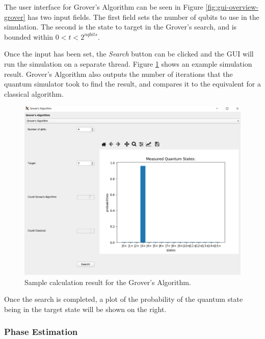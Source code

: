 \documentclass{article}
\begin{document}
The user interface for Grover's Algorithm can be seen in Figure \ref{fig:gui-overview-grover} has two input fields.
The first field sets the number of qubits to use in the simulation.
The second is the state to target in the Grover's search, and is bounded within $0 < t < 2^{nqbits}$.

Once the input has been set, the \textit{Search} button can be clicked and the GUI will run the simulation on a separate thread. Figure \ref{fig:gui-calculation-grovers} shows an example simulation result.
Grover's Algorithm also outputs the number of iterations that the quantum simulator took to find the result, and compares it to the equivalent for a classical algorithm.

\begin{figure}[H]
\includegraphics[width=15cm]{docs/images/gui_calculation_grovers.png}
\caption{\label{fig:gui-calculation-grovers} Sample calculation result for the Grover's Algorithm.}
\end{figure}

Once the search is completed, a plot of the probability of the quantum state 
being in the target state will be shown on the right.

\subsubsection{Phase Estimation}
\end{document}

